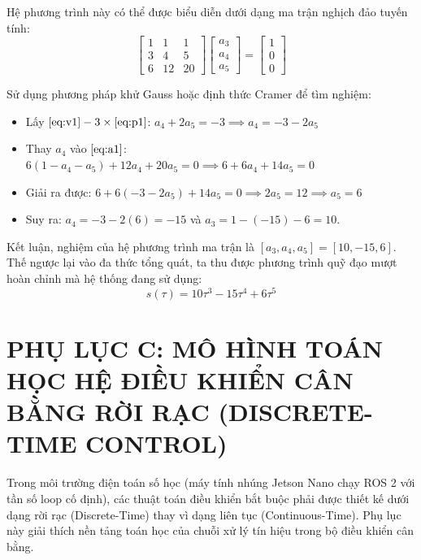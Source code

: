 Hệ phương trình này có thể được biểu diễn dưới dạng ma trận nghịch đảo tuyến tính:
\begin{equation}
\begin{bmatrix}
1 & 1 & 1 \\
3 & 4 & 5 \\
6 & 12 & 20
\end{bmatrix}
\begin{bmatrix}
a_3 \\
a_4 \\
a_5
\end{bmatrix}
=
\begin{bmatrix}
1 \\
0 \\
0
\end{bmatrix}
\end{equation}

Sử dụng phương pháp khử Gauss hoặc định thức Cramer để tìm nghiệm:
\begin{itemize}
    \item Lấy $\eqref{eq:v1} - 3 \times \eqref{eq:p1}$: $a_4 + 2a_5 = -3 \implies a_4 = -3 - 2a_5$
    \item Thay $a_4$ vào $\eqref{eq:a1}$: $6(1 - a_4 - a_5) + 12a_4 + 20a_5 = 0 \implies 6 + 6a_4 + 14a_5 = 0$
    \item Giải ra được: $6 + 6(-3 - 2a_5) + 14a_5 = 0 \implies 2a_5 = 12 \implies a_5 = 6$
    \item Suy ra: $a_4 = -3 - 2(6) = -15$ và $a_3 = 1 - (-15) - 6 = 10$.
\end{itemize}

Kết luận, nghiệm của hệ phương trình ma trận là $[a_3, a_4, a_5] = [10, -15, 6]$. Thế ngược lại vào đa thức tổng quát, ta thu được phương trình quỹ đạo mượt hoàn chỉnh mà hệ thống đang sử dụng:
\begin{equation}
s(\tau) = 10\tau^3 - 15\tau^4 + 6\tau^5
\end{equation}

\vspace{1cm}

\chapter*{PHỤ LỤC C: MÔ HÌNH TOÁN HỌC HỆ ĐIỀU KHIỂN CÂN BẰNG RỜI RẠC (DISCRETE-TIME CONTROL)}

Trong môi trường điện toán số học (máy tính nhúng Jetson Nano chạy ROS 2 với tần số loop cố định), các thuật toán điều khiển bắt buộc phải được thiết kế dưới dạng rời rạc (Discrete-Time) thay vì dạng liên tục (Continuous-Time). Phụ lục này giải thích nền tảng toán học của chuỗi xử lý tín hiệu trong bộ điều khiển cân bằng.

